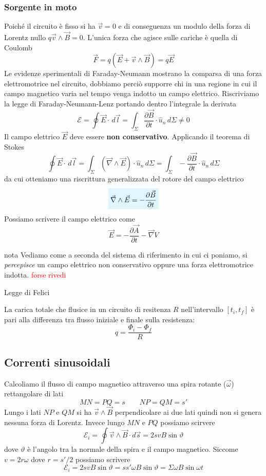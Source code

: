 \documentclass[x11names]{report}
\newcommand{\esempio}[2]{
	\begin{es}{#1}
		#2
	\end{es}
}
\newcommand{\teorema}[2]{
	\begin{center}
		\fboxsep11pt
		\colorbox{myred}{\begin{minipage}{5.75in}
				\begin{redes}{#1}
					#2
				\end{redes}
		\end{minipage}}
	\end{center}
}
\newcommand{\viola}[1]{%
	\colorbox{myblue}{$\displaystyle #1$}
}
\begin{document}
\subsubsection{Sorgente in moto}
Poiché il circuito è fisso si ha \(\vec{v}=0\) e di conseguenza un modulo della forza di Lorentz nullo \(q\vec{v}\wedge\vec{B} = 0\). L'unica forza che agisce sulle cariche è quella di Coulomb
\[
\vec{F} = q\left(\vec{E} + \vec{v}\wedge\vec{B}\right) = q\vec{E}
\]
Le evidenze sperimentali di Faraday-Neumann mostrano la comparsa di una forza elettromotrice nel circuito, dobbiamo perciò supporre chi in una regione in cui il campo magnetico varia nel tempo venga indotto un campo elettrico. Riscriviamo la legge di Faraday-Neumann-Lenz portando dentro l'integrale la derivata
\[
\mathcal{E} = \oint \vec{E}\cdot \, d\vec{l} = \int_\Sigma \frac{\partial \vec{B}}{\partial t} \cdot \hat{u}_n  \, d\Sigma \neq 0
\]
Il campo elettrico \(\vec{E}\) deve essere \textbf{non conservativo}. Applicando il teorema di Stokes
\[
\oint \vec{E}\cdot \, d\vec{l} = \int_\Sigma\left(\vec{\nabla}\wedge\vec{E}\right)\cdot \hat{u}_n \, d\Sigma = \int_\Sigma -\frac{\partial \vec{B}}{\partial t} \cdot \hat{u}_n  \, d\Sigma
\]
da cui otteniamo una riscrittura generalizzata del rotore del campo elettrico
\begin{equation}
	\viola{\vec{\nabla}\wedge\vec{E} = -\frac{\partial \vec{B}}{\partial t}}
\end{equation}
Possiamo scrivere il campo elettrico come
\begin{equation}
	\vec{E} = -\frac{\partial \vec{A}}{\partial t} - \vec{\nabla}V
\end{equation}

\esempio{nota}{Vediamo come a seconda del sistema di riferimento in cui ci poniamo, si \textit{percepisce} un campo elettrico non conservativo oppure una forza elettromotrice indotta. \textcolor{red}{forse rivedi}}

\teorema{Legge di Felici}{
La carica totale che flusice in un circuito di resitenza \(R\) nell'intervallo \([t_i,t_f]\) è pari alla differenza tra flusso iniziale e finale sulla resistenza:
\begin{equation}
	q = \frac{\Phi_i - \Phi_f}{R}
\end{equation}
}

\subsection{Correnti sinusoidali}
Calcoliamo il flusso di campo magnetico attraverso una spira rotante (\(\vec
\omega\)) rettangolare di lati 
\[
MN = PQ = s \qquad NP = QM = s'
\]
Lungo i lati \(NP\) e \(QM\) si ha \(\vec{v}\wedge\vec{B}\) perpendicolare ai due lati quindi non si genera nessuna forza di Lorentz. Invece lungo \(MN\) e \(PQ\) possiamo scirvere
\[
\mathcal{E}_i = \oint \vec{v}\wedge\vec{B} \cdot d\vec{s} = 2svB\sin\vartheta
\]
dove \(\vartheta\) è l'angolo tra la normale della spira e il campo magnetico. Siccome \(v=2r\omega\) dove \(r = s'/2\) possiamo scrivere
\[
\mathcal{E}_i = 2svB\sin\vartheta = ss'\omega B\sin\vartheta = \Sigma \omega B\sin\omega t
\]
\end{document}
